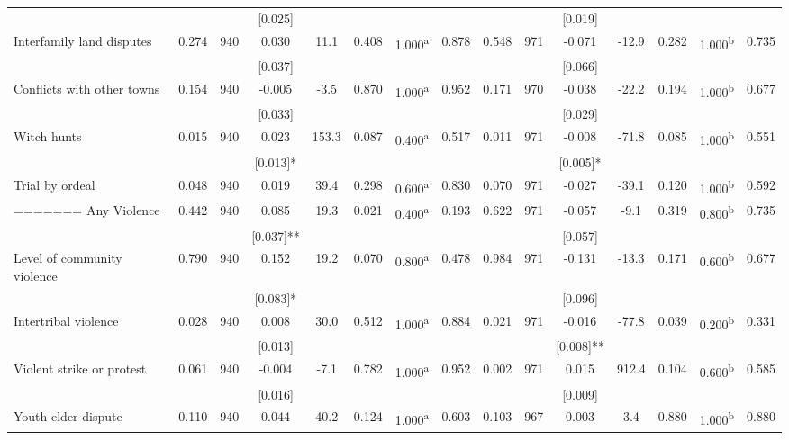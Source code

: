 \begin{tabular}{lcccccccccccccc}
 &  &  & [0.025] &  &  &  &  &  &  & [0.019] &  &  &  & \\
\quad Interfamily land disputes & 0.274 & 940 & 0.030 & 11.1 & 0.408 & 1.000\textsuperscript{a} & 0.878 & 0.548 & 971 & -0.071 & -12.9 & 0.282 & 1.000\textsuperscript{b} & 0.735\\
 &  &  & [0.037] &  &  &  &  &  &  & [0.066] &  &  &  & \\
\quad Conflicts with other towns & 0.154 & 940 & -0.005 & -3.5 & 0.870 & 1.000\textsuperscript{a} & 0.952 & 0.171 & 970 & -0.038 & -22.2 & 0.194 & 1.000\textsuperscript{b} & 0.677\\
 &  &  & [0.033] &  &  &  &  &  &  & [0.029] &  &  &  & \\
\quad Witch hunts & 0.015 & 940 & 0.023 & 153.3 & 0.087 & 0.400\textsuperscript{a} & 0.517 & 0.011 & 971 & -0.008 & -71.8 & 0.085 & 1.000\textsuperscript{b} & 0.551\\
 &  &  & [0.013]* &  &  &  &  &  &  & [0.005]* &  &  &  & \\
\quad Trial by ordeal & 0.048 & 940 & 0.019 & 39.4 & 0.298 & 0.600\textsuperscript{a} & 0.830 & 0.070 & 971 & -0.027 & -39.1 & 0.120 & 1.000\textsuperscript{b} & 0.592\\
=======
\noalign{\smallskip}\hline \noalign{\smallskip}Any Violence & 0.442 & 940 & 0.085 & 19.3 & 0.021 & 0.400\textsuperscript{a} & 0.193 & 0.622 & 971 & -0.057 & -9.1 & 0.319 & 0.800\textsuperscript{b} & 0.735\\
 &  &  & [0.037]** &  &  &  &  &  &  & [0.057] &  &  &  & \\
Level of community violence & 0.790 & 940 & 0.152 & 19.2 & 0.070 & 0.800\textsuperscript{a} & 0.478 & 0.984 & 971 & -0.131 & -13.3 & 0.171 & 0.600\textsuperscript{b} & 0.677\\
 &  &  & [0.083]* &  &  &  &  &  &  & [0.096] &  &  &  & \\
\quad Intertribal violence & 0.028 & 940 & 0.008 & 30.0 & 0.512 & 1.000\textsuperscript{a} & 0.884 & 0.021 & 971 & -0.016 & -77.8 & 0.039 & 0.200\textsuperscript{b} & 0.331\\
 &  &  & [0.013] &  &  &  &  &  &  & [0.008]** &  &  &  & \\
\quad Violent strike or protest & 0.061 & 940 & -0.004 & -7.1 & 0.782 & 1.000\textsuperscript{a} & 0.952 & 0.002 & 971 & 0.015 & 912.4 & 0.104 & 0.600\textsuperscript{b} & 0.585\\
 &  &  & [0.016] &  &  &  &  &  &  & [0.009] &  &  &  & \\
\quad Youth-elder dispute & 0.110 & 940 & 0.044 & 40.2 & 0.124 & 1.000\textsuperscript{a} & 0.603 & 0.103 & 967 & 0.003 & 3.4 & 0.880 & 1.000\textsuperscript{b} & 0.880\\

\end{tabular}
